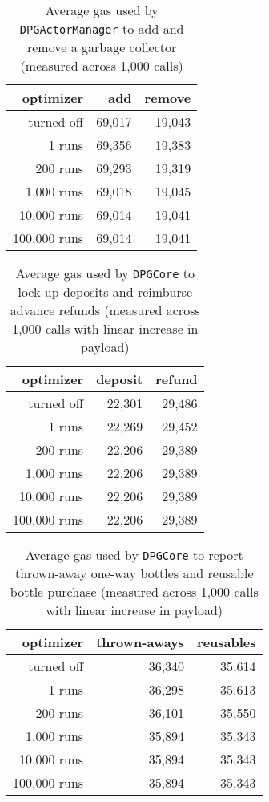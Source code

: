 \begin{appendices}
\begin{table}[hbt]
	\centering	
	\begin{tabular}{r|r|r}
    	optimizer & add & remove \\
    	\hline
    	turned off & 69,017 & 19,043 \\
    	1 runs & 69,356 & 19,383 \\ 
    	200 runs & 69,293 & 19,319 \\
    	1,000 runs & 69,018 & 19,045 \\ 
    	10,000 runs & 69,014 & 19,041 \\
    	100,000 runs & 69,014 & 19,041 \\
	\end{tabular}
	\caption[Gas used to add and remove a garbage collector]{Average gas used by \texttt{DPGActorManager} to add and remove a garbage collector (measured across 1,000 calls)}
	\label{tab:collectorGas}
\end{table}

\begin{table}[hbt]
	\centering	
	\begin{tabular}{r|r|r}
    	optimizer & deposit & refund \\
    	\hline
    	turned off & 22,301 & 29,486 \\
    	1 runs & 22,269 & 29,452 \\ 
    	200 runs & 22,206 & 29,389 \\
    	1,000 runs & 22,206 & 29,389 \\ 
    	10,000 runs & 22,206 & 29,389 \\
    	100,000 runs & 22,206 & 29,389 \\
	\end{tabular}
	\caption[Gas used to lock up deposits and reimburse advance refunds]{Average gas used by \texttt{DPGCore} to lock up deposits and reimburse advance refunds (measured across 1,000 calls with linear increase in payload)}
	\label{tab:depositRefundGas}
\end{table}

\begin{table}[hbt]
	\centering	
	\begin{tabular}{r|r|r}
    	optimizer & thrown-aways & reusables \\
    	\hline
    	turned off & 36,340 & 35,614 \\
    	1 runs & 36,298 & 35,613 \\ 
    	200 runs & 36,101 & 35,550 \\
    	1,000 runs & 35,894 & 35,343 \\ 
    	10,000 runs & 35,894 & 35,343 \\
    	100,000 runs & 35,894 & 35,343 \\
	\end{tabular}
	\caption[Gas used to report thrown-away bottles and reusable bottle purchases]{Average gas used by \texttt{DPGCore} to report thrown-away one-way bottles and reusable bottle purchase (measured across 1,000 calls with linear increase in payload)}
	\label{tab:reportGas}
\end{table}


\end{appendices}
